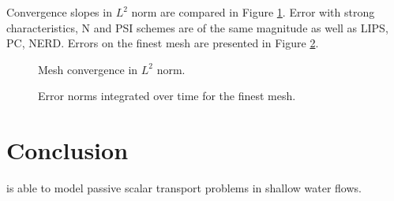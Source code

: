 Convergence slopes in $L^2$ norm are compared in Figure
\ref{t2d:cone:error_timeintegrals}.
Error with strong characteristics, N and PSI schemes are of the same magnitude
as well as LIPS, PC, NERD.
Errors on the finest mesh are presented in Figure
\ref{t2d:cone:error_timeintegrals_mesh3}.

\begin{figure}[h!]
\centering
{}
\caption{Mesh convergence in $L^2$ norm.}
\label{t2d:cone:error_timeintegrals}
\end{figure}

\begin{figure}[H]
\centering
{}
\caption{Error norms integrated over time for the finest mesh.}
\label{t2d:cone:error_timeintegrals_mesh3}
\end{figure}

\section{Conclusion}
 is able to model passive scalar transport problems in shallow water flows.
